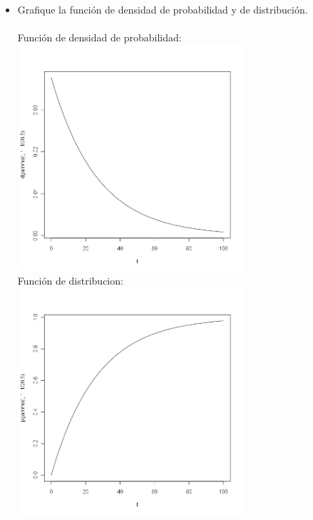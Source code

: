 \begin{itemize}
	\item Grafique la funci\'on de densidad de probabilidad y de distribuci\'on.\\\\
	Funci\'on de densidad de probabilidad:\\
  	  \includegraphics[width=3.3in,height=3.3in]{images/2_5-dgamma.png}\\
	Funci\'on de distribucion:\\
  	  \includegraphics[width=3.3in,height=3.3in]{images/2_5-pgamma.png}
	
\end{itemize}
